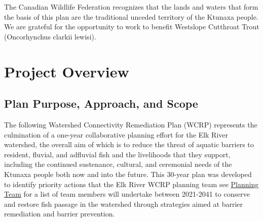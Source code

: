 \documentclass[
  letterpaper,
  DIV=11,
  numbers=noendperiod]{scrreprt}
\begin{document}
The Canadian Wildlife Federation recognizes that the lands and waters
that form the basis of this plan are the traditional unceded territory
of the Ktunaxa people. We are grateful for the opportunity to work to
benefit Westslope Cutthroat Trout (Oncorhynchus clarkii lewisi).


\chapter*{Project Overview}\label{project-overview}


\section*{Plan Purpose, Approach, and
Scope}\label{plan-purpose-approach-and-scope}


The following Watershed Connectivity Remediation Plan (WCRP) represents
the culmination of a one-year collaborative planning effort for the Elk
River watershed, the overall aim of which is to reduce the threat of
aquatic barriers to resident, fluvial, and adfluvial fish and the
livelihoods that they support, including the continued sustenance,
cultural, and ceremonial needs of the Ktunaxa people both now and into
the future. This 30-year plan was developed to identify priority actions
that the Elk River WCRP planning team see
\href{project-partners.qmd}{Planning Team} for a list of team members
will undertake between 2021-2041 to conserve and restore fish passage in
the watershed through strategies aimed at barrier remediation and
barrier prevention.
\end{document}

